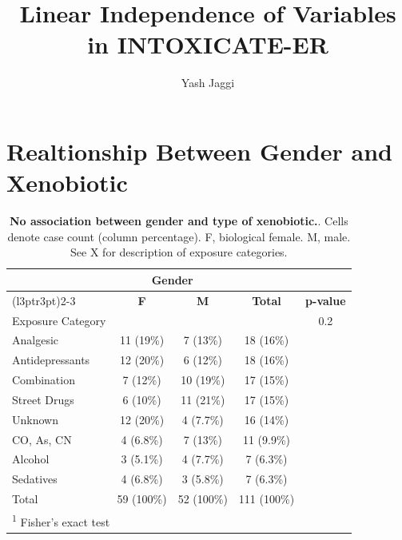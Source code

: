 \documentclass[
]{article}
\title{Linear Independence of Variables in INTOXICATE-ER}
\author{Yash Jaggi}
\date{}
\begin{document}
\maketitle

\section*{Realtionship Between Gender and Xenobiotic}\label{realtionship-between-gender-and-xenobiotic}

\begin{table}[!h]
\centering
\caption{\label{tab:table1}\textbf{No association between gender and type of xenobiotic.}. Cells denote case count (column percentage). F, biological female. M, male. See X for description of exposure categories.}
\centering
\begin{tabular}[t]{lcccc}
\toprule
\multicolumn{1}{c}{ } & \multicolumn{2}{c}{Gender} & \multicolumn{2}{c}{ } \\
\cmidrule(l{3pt}r{3pt}){2-3}
\textbf{} & \textbf{F} & \textbf{M} & \textbf{Total} & \textbf{p-value}\\
\midrule
Exposure Category &  &  &  & 0.2\\
\hspace{1em}Analgesic & 11 (19\%) & 7 (13\%) & 18 (16\%) & \\
\hspace{1em}Antidepressants & 12 (20\%) & 6 (12\%) & 18 (16\%) & \\
\hspace{1em}Combination & 7 (12\%) & 10 (19\%) & 17 (15\%) & \\
\hspace{1em}Street Drugs & 6 (10\%) & 11 (21\%) & 17 (15\%) & \\
\addlinespace
\hspace{1em}Unknown & 12 (20\%) & 4 (7.7\%) & 16 (14\%) & \\
\hspace{1em}CO, As, CN & 4 (6.8\%) & 7 (13\%) & 11 (9.9\%) & \\
\hspace{1em}Alcohol & 3 (5.1\%) & 4 (7.7\%) & 7 (6.3\%) & \\
\hspace{1em}Sedatives & 4 (6.8\%) & 3 (5.8\%) & 7 (6.3\%) & \\
Total & 59 (100\%) & 52 (100\%) & 111 (100\%) & \\
\bottomrule
\multicolumn{5}{l}{\rule{0pt}{1em}\textsuperscript{1} Fisher's exact test}\\
\end{tabular}
\end{table}
\end{document}
